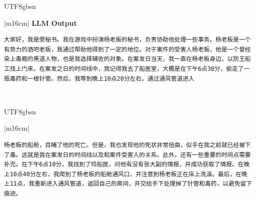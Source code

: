 \documentclass[11pt]{article}
\begin{document}
{\begin{CJK}{UTF8}{gbsn}
\begin{table}[ht!]
\begin{minipage}{\textwidth}
\begin{tabular}{|m{16cm}|}
\hline
{}  {\textbf{LLM Output}} \\
 \begin{minipage}[t]{\linewidth}
\small\begin{verbatim}
大家好，我是雯秘书。我在游戏中扮演杨老板的秘书，负责协助他处理一些事务。杨老板是一个有势力的酒吧老板，我通过帮助他得到了一定的地位。对于案件的受害人杨老板，他是一个曾经染上毒瘾的黑道人物，也是我选择辅佐的对象。在案发日当天，我一直在杨老板身边，以防王船工找上门来。在案发之日的时间线中，我记得我去了船医室，大概是在下午6点30分，偷走了一瓶毒药和一根针管。然后，我等到晚上10点20分左右，通过通风管道进入
\end{verbatim}
\end{minipage} \\


\end{tabular}
\end{minipage}
\end{table}
\end{CJK}

\clearpage
\begin{CJK}{UTF8}{gbsn}
\begin{table}[th!]
\centering
\begin{minipage}{\textwidth}
\begin{tabular}{|m{16cm}|}
\begin{minipage}[t]{\linewidth}
\small\begin{verbatim}
杨老板的船舱，目睹了他的死亡。但是，我也发现他的死状非常扭曲，似乎在我之前就已经被下了毒。这就是我在案发日的时间线以及和案件受害人的关系。此外，还有一些重要的时间点需要补充。在下午6点10分，我找到了玲船医，问他有没有张大副的情报，并成功获取了情报。在晚上10点40分左右，我爬到了杨老板的船舱通风口，并注意到杨老板正在床上洗澡。最后，在晚上11点，我重新进入通风管道，返回自己的房间，并交给手下处理掉了针管和毒药，以避免留下痕迹。

\end{verbatim}
\end{minipage} \\
\hline

\end{tabular}
\end{minipage}
\caption{LLM prompts and outputs for self-refinement.}
\label{table:prompt_self_refinement_cn}
\end{table}
\end{CJK}




}
\end{document}
